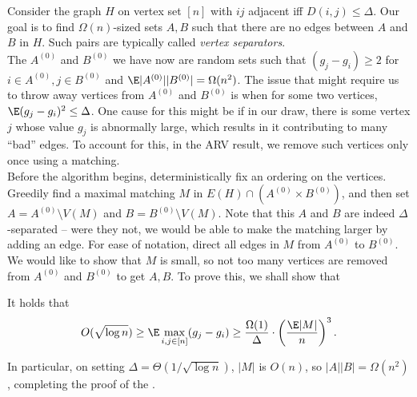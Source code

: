 	Consider the graph $H$ on vertex set $[n]$ with $ij$ adjacent iff $D(i,j) \le \Delta$. Our goal is to find $\Omega(n)$-sized sets $A,B$ such that there are no edges between $A$ and $B$ in $H$. Such pairs are typically called \emph{vertex separators}.\\
	The $A^{(0)}$ and $B^{(0)}$ we have now are random sets such that $(g_j - g_i) \ge 2$ for $i \in A^{(0)}, j \in B^{(0)}$ and $\E |A^{(0)}| |B^{(0)}| = \Omega(n^2)$. The issue that might require us to throw away vertices from $A^{(0)}$ and $B^{(0)}$ is when for some two vertices, $\E (g_j - g_i)^2 \le \Delta$. One cause for this might be if in our draw, there is some vertex $j$ whose value $g_j$ is abnormally large, which results in it contributing to many ``bad'' edges. To account for this, in the ARV result, we remove such vertices only once using a matching.  \\
	Before the algorithm begins, deterministically fix an ordering on the vertices. Greedily find a maximal matching $M$ in $E(H) \cap (A^{(0)} \times B^{(0)})$, and then set $A = A^{(0)} \setminus V(M)$ and $B = B^{(0)} \setminus V(M)$. Note that this $A$ and $B$ are indeed $\Delta$-separated -- were they not, we would be able to make the matching larger by adding an edge. For ease of notation, direct all edges in $M$ from $A^{(0)}$ to $B^{(0)}$.\\
	We would like to show that $M$ is small, so not too many vertices are removed from $A^{(0)}$ and $B^{(0)}$ to get $A,B$.
	To prove this, we shall show that
	\begin{flem}
		\label{lem: arv-matching-size}
		It holds that
		\[ O(\sqrt{\log n}) \ge \E \max_{i,j \in [n]} (g_j - g_i) \ge \frac{\Omega(1)}{\Delta} \cdot \left( \frac{\E |M|}{n} \right)^3. \]
	\end{flem}
	In particular, on setting $\Delta = \Theta(1/\sqrt{\log n})$, $|M|$ is $O(n)$, so $|A||B| = \Omega(n^2)$, completing the proof of the .

